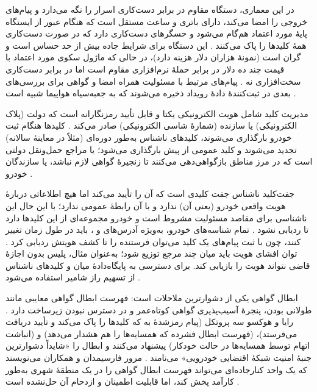 در این معماری، دستگاه مقاوم در برابر دست‌کاری اسرار را نگه می‌دارد و پیام‌های خروجی را امضا می‌کند، دارای باتری و ساعت مستقل است که هنگام عبور از ایستگاه پایهٔ مورد اعتماد هم‌گام می‌شود و حسگرهای دست‌کاری دارد که در صورت دست‌کاری همهٔ کلیدها را پاک می‌کنند \cite{SecuringVehicularAd}. این دستگاه برای شرایط جاده بیش از حد حساس است و گران است (نمونهٔ  هزاران دلار هزینه دارد)، در حالی که ماژول سکوی مورد اعتماد با قیمت چند ده دلار در برابر حملهٔ نرم‌افزاری مقاوم است اما در برابر دست‌کاری سخت‌افزاری نه \cite{SecuringVehicularAd}. پیام‌های مرتبط با مسئولیت همراه امضا و گواهی برای بررسی‌های بعدی در ثبت‌کنندهٔ دادهٔ رویداد ذخیره می‌شوند که به جعبه‌سیاه هواپیما شبیه است \cite{SecuringVehicularAd}.

مدیریت کلید شامل هویت الکترونیکی یکتا و قابل تأیید رمزنگارانه است که دولت (پلاک الکترونیکی) یا سازنده (شمارهٔ شاسی الکترونیکی) صادر می‌کند \cite{SecuringVehicularAd}. کلیدها هنگام ثبت خودرو بارگذاری می‌شوند، کلیدهای ناشناس به‌طور دوره‌ای (مثلاً در معاینهٔ سالانه) تجدید می‌شوند و کلید عمومی  از پیش بارگذاری می‌شود؛  یا مراجع حمل‌ونقل دولتی است که در مرز مناطق بازگواهی‌دهی می‌کنند تا زنجیرهٔ گواهی لازم نباشد، یا سازندگان خودرو \cite{SecuringVehicularAd}.

جفت‌کلید ناشناس جفت کلیدی است که  آن را تأیید می‌کند اما هیچ اطلاعاتی دربارهٔ هویت واقعی خودرو (یعنی  آن) ندارد و با آن رابطهٔ عمومی ندارد؛ با این حال این ناشناسی برای مقاصد مسئولیت مشروط است و خودرو مجموعه‌ای از این کلیدها دارد تا ردیابی نشود \cite{SecuringVehicularAd}. تمام شناسه‌های خودرو، به‌ویژه آدرس‌های  و ، باید در طول زمان تغییر کنند، چون با ثبت پیام‌های یک کلید می‌توان فرستنده را تا کشف هویتش ردیابی کرد \cite{SecuringVehicularAd}. توان افشای هویت باید میان چند مرجع توزیع شود؛ به‌عنوان مثال، پلیس بدون اجازهٔ قاضی نتواند هویت را بازیابی کند. برای دسترسی به پایگاه‌دادهٔ میان  و کلیدهای ناشناس از تسهیم راز شامیر استفاده می‌شود \cite{SecuringVehicularAd}.

ابطال گواهی یکی از دشوارترین ملاحلات است: فهرست ابطال گواهی معایبی مانند طولانی بودن، پنجرهٔ آسیب‌پذیری گواهی کوتاه‌عمر و در دسترس نبودن زیرساخت دارد \cite{SecuringVehicularAd}. رایا و هوکسو سه پروتکل  (پیام رمزشدهٔ  به  که کلیدها را پاک می‌کند و تأیید دریافت می‌فرستد)،  (فهرست ابطال فشرده که همسایه‌ها را هم هشدار می‌دهد) و  (انباشت اتهام توسط همسایه‌ها در حالت خودکار) پیشنهاد می‌کنند و ابطال را «شایداً دشوارترین جنبهٔ امنیت شبکهٔ اقتضایی خودرویی» می‌نامند \cite{SecuringVehicularAd}. مرور فارسیمدان و همکاران می‌نویسند که یک واحد کنارجاده‌ای می‌تواند فهرست ابطال گواهی را در یک منطقهٔ شهری به‌طور کارآمد پخش کند، اما قابلیت اطمینان و ازدحام آن حل‌نشده است \cite{farsimadanReviewSecurityChallenges2025}.

